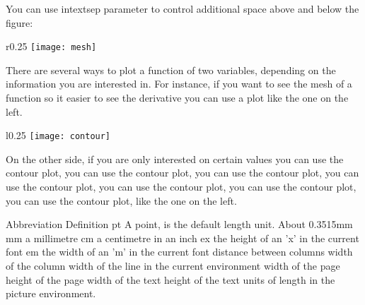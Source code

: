 \usepackage{wrapfig}
You can use intextsep parameter to control additional space above and below the figure: 
\setlength\intextsep{0pt}

\begin{wrapfigure}{r}{0.25\textwidth} %
    \centering
    \texttt{[image: mesh]}
\end{wrapfigure}
 
There are several ways to plot a function of two variables, 
depending on the information you are interested in. For 
instance, if you want to see the mesh of a function so it 
easier to see the derivative you can use a plot like the 
one on the left.
 
 
\begin{wrapfigure}{l}{0.25\textwidth}
    \centering
    \texttt{[image: contour]}
\end{wrapfigure}
 
On the other side, if you are only interested on
certain values you can use the contour plot, you 
can use the contour plot, you can use the contour 
plot, you can use the contour plot, you can use 
the contour plot, you can use the contour plot, 
you can use the contour plot, like the one on the left.

Abbreviation	Definition
pt				A point, is the default length unit. About 0.3515mm
mm				a millimetre
cm				a centimetre
in				an inch
ex				the height of an 'x' in the current font
em				the width of an 'm' in the current font
\columnsep		distance between columns
\columnwidth	width of the column
\linewidth		width of the line in the current environment
\paperwidth		width of the page
\paperheight	height of the page
\textwidth		width of the text
\textheight		height of the text
\unitleght		units of length in the picture environment.
